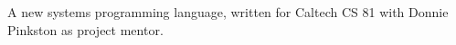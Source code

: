 A new systems programming language, written for Caltech CS 81 with Donnie Pinkston as project mentor. 